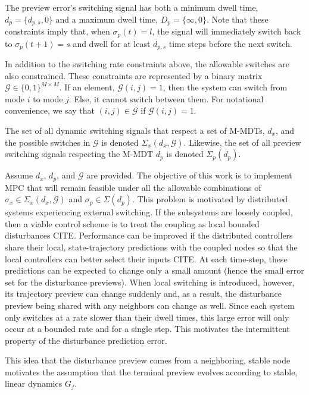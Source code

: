 The preview error's switching signal has both a minimum dwell time, $d_p=\{d_{p,s},0\}$ and a maximum dwell time, $D_p=\{\infty, 0\}$. Note that these constraints imply that, when $\sigma_p(t)=l$, the signal will immediately switch back to $\sigma_p(t+1)=s$ and dwell for at least $d_{p,s}$ time steps before the next switch.

In addition to the switching rate constraints above, the allowable switches are also constrained. These constraints are represented by a binary matrix $\mathcal{G}\in \{0,1\}^{M\times M}$. If an element, $\mathcal{G}(i,j)=1$, then the system can switch from mode $i$ to mode $j$. Else, it cannot switch between them. For notational convenience, we say that $(i,j)\in\mathcal{G}$ if $\mathcal{G}(i,j)=1$.

The set of all dynamic switching signals that respect a set of M-MDTs, $d_x$, and the possible switches in $\mathcal{G}$ is denoted $\Sigma_x(d_x,\mathcal{G})$. Likewise, the set of all preview switching signals respecting the M-MDT $d_{p}$ is denoted $\Sigma_p(d_{p})$. 

Assume $d_x$, $d_p$, and $\mathcal{G}$ are provided. The objective of this work is to implement MPC that will remain feasible under all the allowable combinations of $\sigma_x\in\Sigma_x(d_x,\mathcal{G})$ and $\sigma_p\in\Sigma(d_p)$. This problem is motivated by distributed systems experiencing external switching. If the subsystems are loosely coupled, then a viable control scheme is to treat the coupling as local bounded disturbances \alert{CITE}. Performance can be improved if the distributed controllers share their local, state-trajectory predictions with the coupled nodes so that the local controllers can better select their inputs \alert{CITE}. At each time-step, these predictions can be expected to change only a small amount (hence the small error set for the disturbance previews). When local switching is introduced, however, its trajectory preview can change suddenly and, as a result, the disturbance preview being shared with any neighbors can change as well. Since each system only switches at a rate slower than their dwell times, this large error will only occur at a bounded rate and for a single step. This motivates the intermittent property of the disturbance prediction error.

\begin{remark}
This idea that the disturbance preview comes from a neighboring, stable node motivates the assumption that the terminal preview evolves according to stable, linear dynamics $G_f$.
\end{remark}